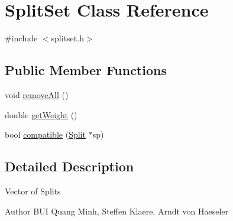 \hypertarget{classSplitSet}{
\section{SplitSet Class Reference}
\label{classSplitSet}
}


{\ttfamily \#include $<$splitset.h$>$}\subsection*{Public Member Functions}
\begin{DoxyCompactItemize}
\item 
void \hyperlink{classSplitSet_a6d18de51f6ef06b6f507f911a07468dc}{removeAll} ()
\item 
double \hyperlink{classSplitSet_ac1eced61b59973480c01fec6ad6ee7b5}{getWeight} ()
\item 
bool \hyperlink{classSplitSet_a4f71eb2dc2d5fd83a17680a539c0afe6}{compatible} (\hyperlink{classSplit}{Split} $\ast$sp)
\end{DoxyCompactItemize}


\subsection{Detailed Description}
Vector of Splits

\begin{DoxyAuthor}{Author}
BUI Quang Minh, Steffen Klaere, Arndt von Haeseler 
\end{DoxyAuthor}


